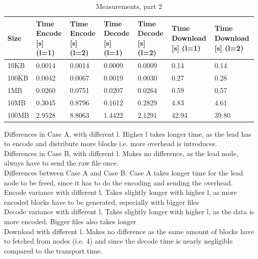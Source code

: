 \begin{table}[H]
    \begin{tabularx}{\textwidth}{|X|X|X|X|X|X|X|}
        \hline
        \cellcolor{lightgray}\textbf{Size} & \cellcolor{lightgray}\textbf{Time Encode [s] (l=1)} & \cellcolor{lightgray}\textbf{Time Encode [s] (l=2)} & \cellcolor{lightgray}\textbf{Time Decode [s] (l=1)} & \cellcolor{lightgray}\textbf{Time Decode [s] (l=2)} & \cellcolor{lightgray}\textbf{Time Download [s] (l=1)} & \cellcolor{lightgray}\textbf{Time Download [s] (l=2)} \\\hline
        10KB  & 0.0014 & 0.0014 & 0.0009 & 0.0009 & 0.14  & 0.14  \\\hline
        100KB & 0.0042 & 0.0067 & 0.0019 & 0.0030 & 0.27  & 0.28  \\\hline
        1MB   & 0.0260 & 0.0751 & 0.0207 & 0.0264 & 0.59  & 0.57  \\\hline
        10MB  & 0.3045 & 0.8796 & 0.1612 & 0.2829 & 4.83  & 4.61  \\\hline
        100MB & 2.9528 & 8.8063 & 1.4422 & 2.1291 & 42.94 & 39.80 \\\hline
    \end{tabularx}
    \caption{Measurements, part 2}
	\label{tab:e3meas2}
\end{table}

Differences in Case A, with different l. Higher l takes longer time, as the lead has to encode and distribute more blocks i.e. more overhead is introduces. \\
Differences in Case B, with different l. Makes no difference, as the lead node, always have to send the raw file once. \\
Differences between Case A and Case B. Case A takes longer time for the lead node to be freed, since it has to do the encoding and sending the overhead.
Encode variance with different l. Takes slightly longer with higher l, as more encoded blocks have to be generated, especially with bigger files\\
Decode variance with different l. Takes slightly longer with higher l, as the data is more encoded. Bigger files also takes longer \\
Download with different l. Makes no difference as the same amount of blocks have to fetched from nodes (i.e. 4) and since the decode time is nearly negligible compared to the transport time.